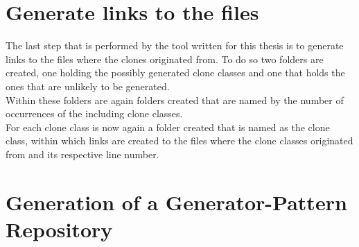 \section{Generate links to the files}
The last step that is performed by the tool written for this thesis is to generate links to the files where the clones originated from. To do so two folders are created, one holding the possibly generated clone classes and one that holds the ones that are unlikely to be generated.\\
Within these folders are again folders created that are named by the number of occurrences of the including clone classes.\\
For each clone class is now again a folder created that is named as the clone class, within which links are created to the files where the clone classes originated from and its respective line number.

\section{Generation of a Generator-Pattern Repository}

